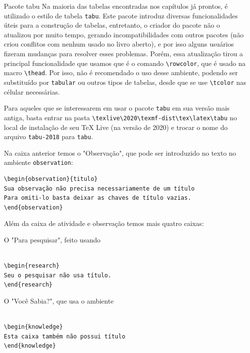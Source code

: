 \begin{observation}{Pacote tabu}
Na maioria das tabelas encontradas nos capítulos já prontos, é utilizado o estilo de tabela \verb|tabu|. Este pacote introduz diversas funcionalidades úteis para a construção de tabelas, entretanto, o criador do pacote não o atualizou por muito tempo, gerando incompatibilidades com outros pacotes (não criou conflitos com nenhum usado no livro aberto), e por isso alguns usuários fizeram mudanças para resolver esses problemas. Porém, essa atualização tirou a principal funcionalidade que usamos que é o comando \verb|\rowcolor|, que é usado na macro \verb|\thead|. Por isso, não é recomendado o uso desse ambiente, podendo ser substituído por \verb|tabular| ou outros tipos de tabelas, desde que se use \verb|\tcolor| nas célular necessárias. 

Para aqueles que se interessarem em usar o pacote \verb|tabu| em sua versão mais antiga, basta entrar na pasta \verb|\texlive\2020\texmf-dist\tex\latex\tabu| no local de instalação de seu \TeX{} Live (na versão de 2020) e trocar o nome do arquivo \verb|tabu-2018| para \verb|tabu|.
\end{observation}

Na caixa anterior temos o "Observação", que pode ser introduzido no texto no ambiente \verb|observation|:
\begin{verbatim}
\begin{observation}{titulo}
Sua observação não precisa necessariamente de um título
Para omiti-lo basta deixar as chaves de título vazias.
\end{observation}
\end{verbatim}

Além da caixa de atividade e observação temos mais quatro caixas:

\begin{research}
O "Para pesquisar", feito usando

\begin{verbatim}

\begin{research}
Seu o pesquisar não usa título.
\end{research}
\end{verbatim}
\end{research}

\begin{knowledge}
O "Você Sabia?", que usa o ambiente

\begin{verbatim}

\begin{knowledge}
Esta caixa também não possui título
\end{knowledge}
\end{verbatim}
\end{knowledge}

